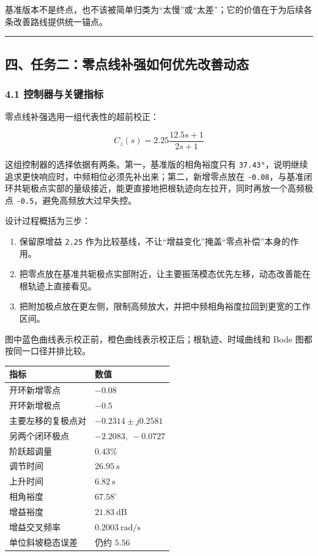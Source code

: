 \documentclass[
  11pt]{article}
\providecommand{\tightlist}{%
  \setlength{\itemsep}{0pt}\setlength{\parskip}{0pt}}
\begin{document}
基准版本不是终点，也不该被简单归类为``太慢''或``太差''；它的价值在于为后续各条改善路线提供统一锚点。

\begin{center}\rule{0.5\linewidth}{0.5pt}\end{center}

\subsection{四、任务二：零点线补强如何优先改善动态}\label{ux56dbux4efbux52a1ux4e8cux96f6ux70b9ux7ebfux8865ux5f3aux5982ux4f55ux4f18ux5148ux6539ux5584ux52a8ux6001}

\subsubsection{4.1
控制器与关键指标}\label{ux63a7ux5236ux5668ux4e0eux5173ux952eux6307ux6807-1}

零点线补强选用一组代表性的超前校正：

\[
C_z(s)=2.25\frac{12.5s+1}{2s+1}
\]

这组控制器的选择依据有两条。第一，基准版的相角裕度只有
\texttt{37.43°}，说明继续追求更快响应时，中频相位必须先补出来；第二，新增零点放在
\texttt{-0.08}，与基准闭环共轭极点实部的量级接近，能更直接地把根轨迹向左拉开，同时再放一个高频极点
\texttt{-0.5}，避免高频放大过早失控。

设计过程概括为三步：

\begin{enumerate}
\def\labelenumi{\arabic{enumi}.}
\tightlist
\item
  保留原增益 \texttt{2.25}
  作为比较基线，不让``增益变化''掩盖``零点补偿''本身的作用。
\item
  把零点放在基准共轭极点实部附近，让主要振荡模态优先左移，动态改善能在根轨迹上直接看见。
\item
  把附加极点放在更左侧，限制高频放大，并把中频相角裕度拉回到更宽的工作区间。
\end{enumerate}

图中蓝色曲线表示校正前，橙色曲线表示校正后；根轨迹、时域曲线和 Bode
图都按同一口径并排比较。

\begin{longtable}[]{@{}ll@{}}
\toprule\noalign{}
指标 & 数值 \\
\midrule\noalign{}
\endhead
\bottomrule\noalign{}
\endlastfoot
开环新增零点 & \(-0.08\) \\
开环新增极点 & \(-0.5\) \\
主要左移的复极点对 & \(-0.2314 \pm j0.2581\) \\
另两个闭环极点 & \(-2.2083,\ -0.0727\) \\
阶跃超调量 & \(0.43\%\) \\
调节时间 & \(26.95\ \mathrm{s}\) \\
上升时间 & \(6.82\ \mathrm{s}\) \\
相角裕度 & \(67.58^\circ\) \\
增益裕度 & \(21.83\ \mathrm{dB}\) \\
增益交叉频率 & \(0.2003\ \mathrm{rad/s}\) \\
单位斜坡稳态误差 & 仍约 \(5.56\) \\
\end{longtable}
\end{document}
